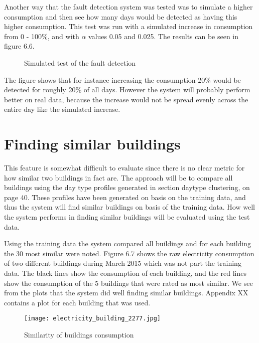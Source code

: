 Another way that the fault detection system was tested was to simulate a higher consumption and then see how many days would be detected as having this higher consumption. This test was run with a simulated increase in consumption from 0 - 100\%, and with $\alpha$ values 0.05 and 0.025. The results can be seen in figure 6.6.
\begin{figure}
\begin{center}

\end{center}
\caption{Simulated test of the fault detection}
\end{figure}
The figure shows that for instance increasing the consumption 20\% would be detected for roughly 20\% of all days. However the system will probably perform better on real data, because the increase would not be spread evenly across the entire day like the simulated increase.
\section*{Finding similar buildings}
This feature is somewhat difficult to evaluate since there is no clear metric for how similar two buildings in fact are. The approach will be to compare all buildings using the day type profiles generated in section daytype clustering, on page 40. These profiles have been generated on basis on the training data, and thus the system will find similar buildings on basis of the training data. How well the system performs in finding similar buildings will be evaluated using the test data.

Using the training data the system compared all buildings and for each building the 30 most similar were noted. Figure 6.7 shows the raw electricity consumption of two different buildings during March 2015 which was not part the training data. The black lines show the consumption of each building, and the red lines show the consumption of the 5 buildings that were rated as most similar. We see from the plots that the system did well finding similar buildings. Appendix XX contains a plot for each building that was used.
\begin{figure}
\begin{center}
\texttt{[image: electricity\_building\_2277.jpg]}
\end{center}
\caption{Similarity of buildings consumption}
\end{figure}

